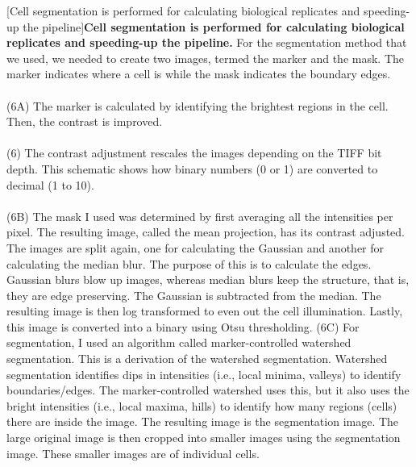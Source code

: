 \begin{centering}
[Cell segmentation is performed for calculating biological replicates and speeding-up the pipeline]{\textbf{Cell segmentation is performed for calculating biological replicates and speeding-up the pipeline.} For the segmentation method that we used, we needed to create two images, termed the marker and the mask. The marker indicates where a cell is while the mask indicates the boundary edges.
\\
\\
(6A) The marker is calculated by identifying the brightest regions in the cell. Then, the contrast is improved.
\\
\\
(6) The contrast adjustment rescales the images depending on the TIFF bit depth. This schematic shows how binary numbers (0 or 1) are converted to decimal (1 to 10).
\\
\\
(6B) The mask I used was determined by first averaging all the intensities per pixel. The resulting image, called the mean projection, has its contrast adjusted. The images are split again, one for calculating the Gaussian and another for calculating the median blur. The purpose of this is to calculate the edges. Gaussian blurs blow up images, whereas median blurs keep the structure, that is, they are edge preserving. The Gaussian is subtracted from the median. The resulting image is then log transformed to even out the cell illumination. Lastly, this image is converted into a binary using Otsu thresholding. (6C) For segmentation, I used an algorithm called marker-controlled watershed segmentation. This is a derivation of the watershed segmentation. Watershed segmentation identifies dips in intensities (i.e., local minima, valleys) to identify boundaries/edges. The marker-controlled watershed uses this, but it also uses the bright intensities (i.e., local maxima, hills) to identify how many regions (cells) there are inside the image. The resulting image is the segmentation image. The large original image is then cropped into smaller images using the segmentation image. These smaller images are of individual cells.}
\label{m:3}
\end{centering}

